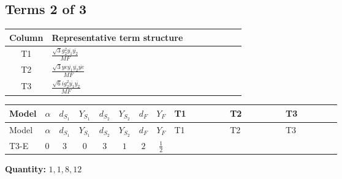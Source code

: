\documentclass[8pt]{article}
\begin{document}
\begin{landscape}
\subsection*{Terms 2 of 3}
\begin{center}
\begin{tabular}{@{}c >{\raggedright\arraybackslash}p{0.82\linewidth}@{}}
\toprule
Column & Representative term structure \\
\midrule
T1 & \(\displaystyle \frac{\sqrt{3} g_{2}^{2} \overline{y_{1}} \overline{y_{2}}}{MF}\) \\
\midrule
T2 & \(\displaystyle \frac{\sqrt{3} ye \overline{y_{1}} \overline{y_{2}} \overline{ye}}{MF}\) \\
\midrule
T3 & \(\displaystyle \frac{\sqrt{6} i g_{2}^{2} \overline{y_{1}} \overline{y_{2}}}{MF}\) \\
\midrule
\bottomrule
\end{tabular}
\end{center}
\smallskip
\tiny
\begin{longtable}{@{}llcccccc >{\raggedright\arraybackslash}p{0.21\linewidth} >{\raggedright\arraybackslash}p{0.21\linewidth} >{\raggedright\arraybackslash}p{0.21\linewidth}@{}}
\toprule
Model & $\alpha$ & $d_{S_1}$ & $Y_{S_1}$ & $d_{S_2}$ & $Y_{S_2}$ & $d_F$ & $Y_F$ & T1 & T2 & T3 \\
\midrule
\endfirsthead
\toprule
Model & $\alpha$ & $d_{S_1}$ & $Y_{S_1}$ & $d_{S_2}$ & $Y_{S_2}$ & $d_F$ & $Y_F$ & T1 & T2 & T3 \\
\midrule
\endhead
T3-E & $0$ & $3$ & $0$ & $3$ & $1$ & $2$ & $\frac{1}{2}$ & \scriptsize\adjustbox{max width=\linewidth}{$\begin{gathered} \frac{49 \sqrt{3} g_{2}^{2} \overline{y_{1}} \overline{y_{2}}}{24 MF}\end{gathered}$} & \scriptsize\adjustbox{max width=\linewidth}{$\begin{gathered} - \frac{\sqrt{3} ye \overline{y_{1}} \overline{y_{2}} \overline{ye}}{12 MF}\end{gathered}$} & \scriptsize\adjustbox{max width=\linewidth}{$\begin{gathered} \frac{\sqrt{6} i g_{2}^{2} \overline{y_{1}} \overline{y_{2}}}{3 MF}\end{gathered}$} \\
\midrule
\bottomrule
\end{longtable}
\clearpage
\noindent\textbf{Quantity: }$\mathrm{1,1,8,12}$\par\smallskip

\end{landscape}
\end{document}
